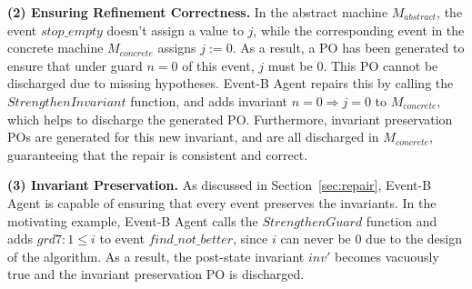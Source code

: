 \textbf{(2) Ensuring Refinement Correctness.}
In the abstract machine $M_{abstract}$, the event $stop\_empty$ doesn't assign a value to $j$, while the corresponding event in the concrete machine $M_{concrete}$ assigns $j:=0$.
As a result, a PO has been generated to ensure that under guard $n=0$ of this event, $j$ must be 0.
This PO cannot be discharged due to missing hypotheses.
Event-B Agent repairs this by calling the $StrengthenInvariant$ function, and adds invariant $n=0 \Rightarrow j=0$ to $M_{concrete}$, which helps to discharge the generated PO.
Furthermore, invariant preservation POs are generated for this new invariant, and are all discharged in $M_{concrete}$, guaranteeing that the repair is consistent and correct.

\textbf{(3) Invariant Preservation.}
As discussed in Section~\ref{sec:repair}, Event-B Agent is capable of ensuring that every event preserves the invariants.
In the motivating example, Event-B Agent calls the $StrengthenGuard$ function and adds $grd7: 1 \leq i$ to event $find\_not\_better$, since $i$ can never be 0 due to the design of the algorithm.
As a result, the post-state invariant $inv'$ becomes vacuously true and the invariant preservation PO is discharged.
